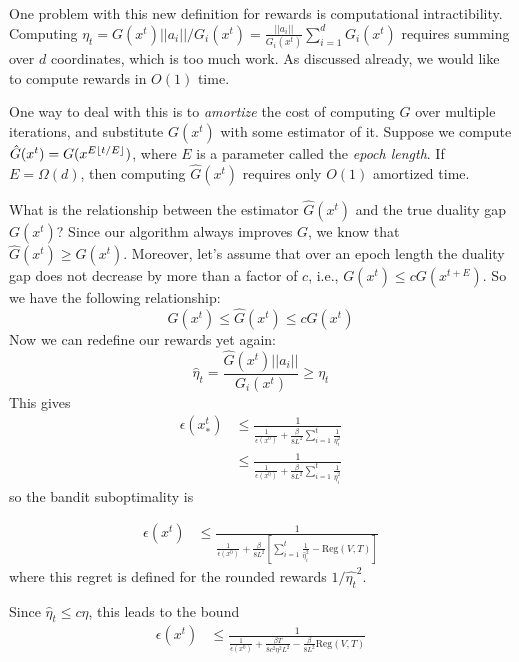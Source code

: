 \documentclass[letterpaper]{article}
\DeclarePairedDelimiter\floor{\lfloor}{\rfloor}
\begin{document}
One problem with this new definition for rewards is computational intractibility. Computing $\eta_t = G(x^t) ||a_i||/G_i(x^t) = \frac{||a_i||}{G_i(x^t)} \sum_{i=1}^d G_i(x^t)$ requires summing over $d$ coordinates, which is too much work. As discussed already, we would like to compute rewards in $O(1)$ time.

One way to deal with this is to \emph{amortize} the cost of computing $G$ over multiple iterations, and substitute $G(x^t)$ with some estimator of it. 
Suppose we compute $\hat{G}(x^t) = G(x^{E\floor{t/E}})$, where $E$ is a parameter called the \emph{epoch length}. If $E = \Omega(d)$, then computing $\hat{G}(x^t)$ requires only $O(1)$ amortized time.


What is the relationship between the estimator $\hat{G}(x^t)$ and the true duality gap $G(x^t)$? Since our algorithm always improves $G$, we know that $\hat{G}(x^t) \geq G(x^t)$. Moreover, let's assume that over an epoch length the duality gap does not decrease by more than a factor of $c$, i.e., $G(x^{t}) \leq c G(x^{t+E})$. 
So we have the following relationship:
\begin{equation}
    G(x^t) \leq \hat{G}(x^t) \leq c G(x^t)
\end{equation}
Now we can redefine our rewards yet again:
\begin{equation}
\hat{\eta}_t = \frac{\hat{G}(x^t) ||a_i||}{G_i(x^t)} \geq \eta_t
\end{equation}
This gives
\begin{align}
    \epsilon(x^t_*) &\leq \frac{1}{\frac{1}{\epsilon(x^0)}  + \frac{\beta}{8L^2} \sum_{i=1}^t \frac{1}{\eta_i^2}} \\
    &\leq \frac{1}{\frac{1}{\epsilon(x^0)}  + \frac{\beta}{8L^2} \sum_{i=1}^t \frac{1}{\hat{\eta}_i^2}}
\end{align}
so the bandit suboptimality is 

\begin{align}
    \epsilon(x^t) &\leq\frac{1}{\frac{1}{\epsilon(x^0)}  + \frac{\beta}{8L^2} \left[\sum_{i=1}^t \frac{1}{\hat{\eta}_i^2} - \text{Reg}(V,T)\right]}
\end{align}
where this regret is defined for the rounded rewards $1/\hat{\eta_t}^2$.


Since $\hat{\eta}_t \leq c\eta$, this leads to the bound
\begin{align}
    \epsilon(x^t) &\leq\frac{1}{\frac{1}{\epsilon(x^0)}  + \frac{\beta T}{8c^2 \eta^2 L^2} - \frac{\beta}{8 L^2} \text{Reg}(V,T)}    
    \label{eq:suboptimality_with_regret}
\end{align}
\end{document}
